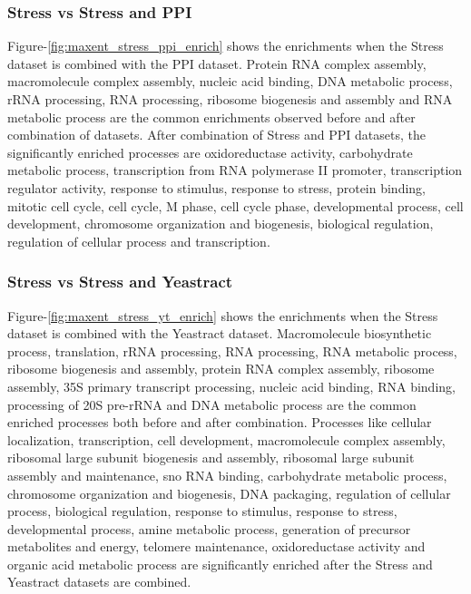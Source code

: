 \subsubsection{Stress vs Stress and PPI}
Figure-\ref{fig:maxent_stress_ppi_enrich} shows the enrichments when the Stress dataset is combined with the PPI dataset. Protein RNA complex assembly, macromolecule complex assembly, nucleic acid binding, DNA metabolic process, rRNA processing, RNA processing, 
ribosome biogenesis and assembly and RNA metabolic process are the common enrichments observed before and after combination of datasets. 
After combination of Stress and PPI datasets, the significantly enriched processes are oxidoreductase activity, carbohydrate metabolic process, 
transcription from RNA polymerase II promoter, transcription regulator activity, response to stimulus, response to stress, protein binding, mitotic cell 
cycle, cell cycle, M phase, cell cycle phase, developmental process, cell development, chromosome organization and biogenesis, biological regulation, 
regulation of cellular process and transcription.

\subsubsection{Stress vs Stress and Yeastract}
Figure-\ref{fig:maxent_stress_yt_enrich} shows the enrichments when the Stress dataset is combined with the Yeastract dataset. Macromolecule biosynthetic process, translation, rRNA processing, RNA processing, RNA metabolic process, ribosome biogenesis and assembly, 
protein RNA complex assembly, ribosome  assembly, 35S primary transcript processing, nucleic acid binding, RNA binding, processing of 20S pre-rRNA and 
DNA metabolic process are the common enriched processes both before and after combination. Processes like cellular localization, transcription, 
cell development, macromolecule complex 
assembly, ribosomal large subunit biogenesis and assembly, ribosomal large subunit assembly and maintenance, sno RNA binding, carbohydrate 
metabolic process, chromosome organization and biogenesis, DNA packaging, regulation of cellular process, biological regulation, response to stimulus, 
response to stress, developmental process, amine metabolic process, generation of precursor metabolites and energy, telomere maintenance, 
oxidoreductase activity and organic acid metabolic process  are significantly enriched after the Stress and Yeastract datasets are combined.

